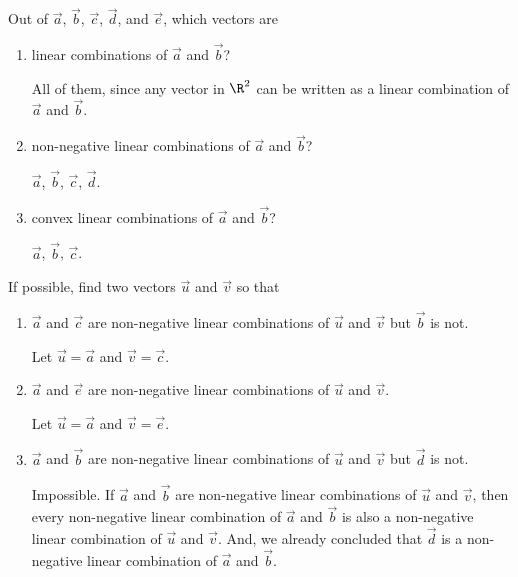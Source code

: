 \documentclass{problemset}
\begin{document}
	\begin{parts}
		\item Out of $\vec a$, $\vec b$, $\vec c$, $\vec d$, and $\vec e$, which
			vectors are
			\begin{enumerate}
				\item linear combinations of $\vec a$ and $\vec b$?
				\begin{solution}[inline]
					All of them, since any vector in $\R^2$ can be written as a linear combination
					of $\vec a$ and $\vec b$.
				\end{solution}

				\item non-negative linear combinations of $\vec a$ and $\vec b$?
				\begin{solution}[inline]
					$\vec a$, $\vec b$, $\vec c$, $\vec d$.
				\end{solution}

				\item convex linear combinations of $\vec a$ and $\vec b$?
				\begin{solution}[inline]
					$\vec a$, $\vec b$, $\vec c$.
				\end{solution}
			\end{enumerate}

		\item If possible, find two vectors $\vec u$ and $\vec v$ so that
			\begin{enumerate}
				\item $\vec a$ and $\vec c$ are non-negative linear combinations
					of $\vec u$ and $\vec v$ but $\vec b$ is not.
				\begin{solution}
					Let $\vec u=\vec a$ and $\vec v=\vec c$.
				\end{solution}

				\item $\vec a$ and $\vec e$ are non-negative linear combinations
					of $\vec u$ and $\vec v$.
				\begin{solution}
					Let $\vec u=\vec a$ and $\vec v=\vec e$.
				\end{solution}

				\item $\vec a$ and $\vec b$ are non-negative linear combinations
					of $\vec u$ and $\vec v$ but $\vec d$ is not.
				\begin{solution}
					Impossible. If $\vec a$ and $\vec b$ are non-negative
					linear combinations of $\vec u$ and $\vec v$, then every non-negative
					linear combination of $\vec a$ and $\vec b$ is also a non-negative
					linear combination of $\vec u$ and $\vec v$. And, we already concluded that
					$\vec d$ is a non-negative linear combination of $\vec a$ and $\vec b$.
				\end{solution}


\end{enumerate}
\end{parts}
\end{document}
